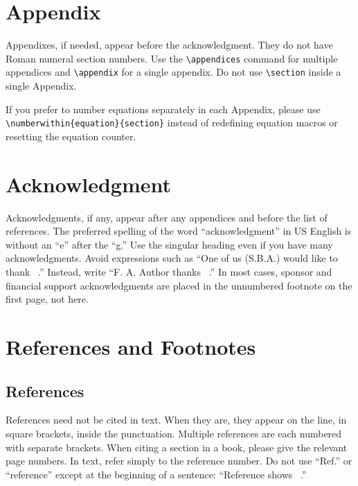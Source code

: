 \documentclass{IEEEtran}
\begin{document}
\appendices

\section*{Appendix}

Appendixes, if needed, appear before the acknowledgment. They do not have
Roman numeral section numbers. Use
the \verb|\appendices| command for multiple appendices and
\verb|\appendix| for a single appendix. Do not use \verb|\section|
inside a single Appendix.

If you prefer to number equations separately in each Appendix, please
use \verb|\numberwithin{equation}{section}| instead of redefining
equation macros or resetting the equation counter.

\section*{Acknowledgment}

Acknowledgments, if any, appear after any appendices and before the list of
references. The preferred spelling of the word ``acknowledgment'' in US
English is without an ``e'' after the ``g.'' Use the singular heading even
if you have many acknowledgments. Avoid expressions such as ``One of us
(S.B.A.) would like to thank \textellipsis~.'' Instead, write ``F. A. Author thanks
\textellipsis~.'' In most cases, sponsor and financial support acknowledgments are
placed in the unnumbered footnote on the first page, not here.

\section*{References and Footnotes}

\subsection{References}
References need not be cited in text. When they are, they appear on the
line, in square brackets, inside the punctuation. Multiple references are
each numbered with separate brackets. When citing a section in a book,
please give the relevant page numbers. In text, refer simply to the
reference number. Do not use ``Ref.'' or ``reference'' except at the
beginning of a sentence: ``Reference \cite{b3} shows \textellipsis~.''
\end{document}
